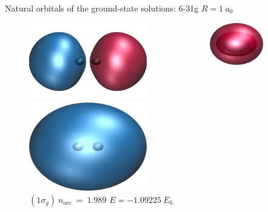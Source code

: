 \documentclass[10pt]{beamer}
\begin{document}
\begin{frame}{Natural orbitals of the ground-state solutions:  6-31g $R=1~a_0$}
  \begin{figure}
    \begin{columns}[b]
      \pause[1]
      \begin{column}{0.31\textwidth}
        \includegraphics[width=0.7\textwidth]{Figures/h2_HF_mo2.cube.png}
        \caption*{\centering $(1\sigma_u)~n_\text{occ}~=~0.011$}
        \includegraphics[width=0.7\textwidth]{Figures/h2_HF_mo1.cube.png}
        \caption*{\centering $(1\sigma_g)~n_\text{occ}~=~1.989$
        $E=-1.09225~E_h$}
      \end{column}
      \pause[2]
      \begin{column}{0.31\textwidth}
        \includegraphics[width=0.7\textwidth]{Figures/h2_HF_mo3.cube.png}

\end{column}
\end{columns}
\end{figure}
\end{frame}
\end{document}
